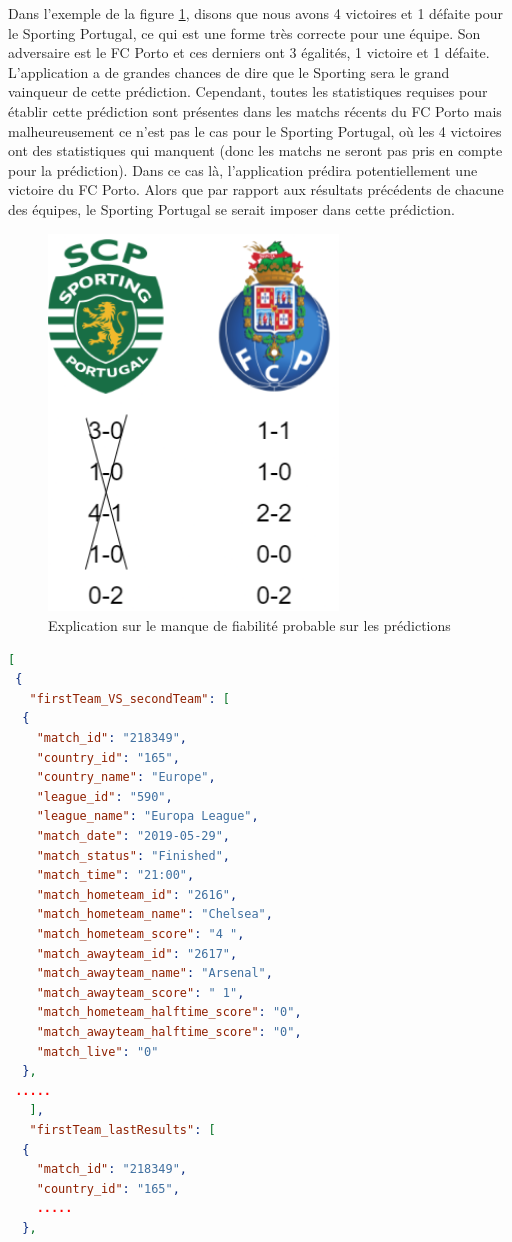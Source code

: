 \documentclass[a4paper,14pt]{extarticle}
\begin{document}
{Dans l'exemple de la figure \ref{fig:explicationStatsManquante}, disons que nous avons 4 victoires et 1 défaite pour le Sporting Portugal, ce qui est une forme très correcte pour une équipe. Son adversaire est le FC Porto et ces derniers ont 3 égalités, 1 victoire et 1 défaite. L'application a de grandes chances de dire que le Sporting sera le grand vainqueur de cette prédiction. Cependant, toutes les statistiques requises pour établir cette prédiction sont présentes dans les matchs récents du FC Porto mais malheureusement ce n'est pas le cas pour le Sporting Portugal, où les 4 victoires ont des statistiques qui manquent (donc les matchs ne seront pas pris en compte pour la prédiction). Dans ce cas là, l'application prédira potentiellement une victoire du FC Porto. Alors que par rapport aux résultats précédents de chacune des équipes, le Sporting Portugal se serait imposer dans cette prédiction.

\begin{figure}[H]
    \centering
    \includegraphics[height=10cm]{../img/explicationStatsManquante.png}
    \caption{Explication sur le manque de fiabilité probable sur les prédictions}
    \label{fig:explicationStatsManquante}
\end{figure}

\begin{lstlisting}[language=json, firstnumber=1, caption=Aperçu du JSON de l'endpoint H2H, captionpos=b, label=apercuJSONH2H]
[
 {
   "firstTeam_VS_secondTeam": [
  {
    "match_id": "218349",
    "country_id": "165",
    "country_name": "Europe",
    "league_id": "590",
    "league_name": "Europa League",
    "match_date": "2019-05-29",
    "match_status": "Finished",
    "match_time": "21:00",
    "match_hometeam_id": "2616",
    "match_hometeam_name": "Chelsea",
    "match_hometeam_score": "4 ",
    "match_awayteam_id": "2617",
    "match_awayteam_name": "Arsenal",
    "match_awayteam_score": " 1",
    "match_hometeam_halftime_score": "0",
    "match_awayteam_halftime_score": "0",
    "match_live": "0"
  },
 .....
   ],
   "firstTeam_lastResults": [
  {
    "match_id": "218349",
    "country_id": "165",
    .....
  },
  

\end{lstlisting}}
\end{document}
